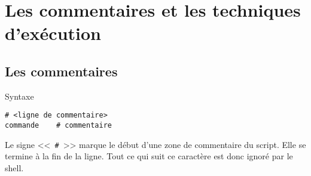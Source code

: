 %
%

\setcounter{remarque-cnt}{1}
\setcounter{example-cnt}{1}
\chapter{Les commentaires et les techniques d'ex{\'e}cution}
\thispagestyle{fancy}

\section{\label{commexec-comments}Les commentaires}

\begin{definition}{Syntaxe}
\begin{verbatim}
# <ligne de commentaire>
commande	# commentaire
\end{verbatim}
\end{definition}

Le signe <<~\verb=#=~>> marque le d{\'e}but d{'}une zone de commentaire du script.
Elle se termine {\`a} la fin de la ligne. Tout ce qui suit ce caract{\`e}re est donc ignor{\'e} par le shell.

